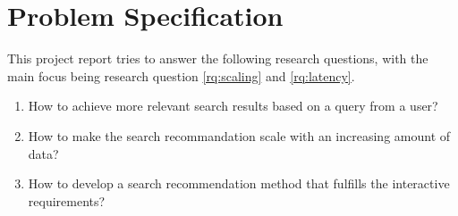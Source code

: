 \section{Problem Specification}
\label{sec:problem-specification}
This project report tries to answer the following research questions, with the main focus being research question \ref{rq:scaling} and \ref{rq:latency}.

\begin{enumerate}
  \item How to achieve more relevant search results based on a query from a user?
  \item\label{rq:scaling} How to make the search recommandation scale with an increasing amount of data?
  \item\label{rq:latency} How to develop a search recommendation method that fulfills the interactive requirements?
\end{enumerate}
